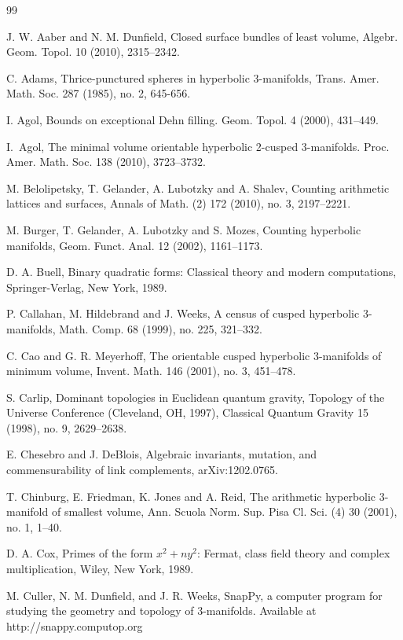 \documentclass[reqno]{amsproc}  %
\begin{document}
\begin{thebibliography}{99}

J. W. Aaber and N. M. Dunfield, Closed surface bundles of least volume, Algebr.  Geom. Topol. 10 (2010), 2315--2342. 

 	C. Adams, Thrice-punctured spheres in hyperbolic 3-manifolds, Trans. Amer. Math. Soc. 287 (1985), no. 2, 645-656. 

     I. Agol, 
Bounds on exceptional Dehn filling. Geom. Topol. 4 (2000), 431--449. 

I.~Agol, {The minimal volume orientable hyperbolic 2-cusped 3-manifolds}.
Proc. Amer. Math. Soc. {138} (2010), 3723--3732.

 M. Belolipetsky, T. Gelander, A. Lubotzky and A. Shalev,
Counting arithmetic lattices and surfaces, Annals of Math. (2) 172 (2010), no. 3,  2197--2221.

  M. Burger, T. Gelander, A. Lubotzky and S. Mozes,
Counting hyperbolic manifolds, Geom. Funct. Anal. 12 (2002), 1161--1173.

 D. A. Buell, Binary quadratic forms:
Classical theory and modern computations, Springer-Verlag, New York, 1989.

 P. Callahan, M. Hildebrand and  J. Weeks, 
A census of cusped hyperbolic 3-manifolds, Math. Comp. 68 (1999), no. 225, 321--332. 

 C. Cao and G. R. Meyerhoff, 
The orientable cusped hyperbolic 3-manifolds of minimum volume,
Invent. Math. 146 (2001), no. 3, 451--478. 

 S. Carlip,    
Dominant topologies in Euclidean quantum gravity,
Topology of the Universe Conference (Cleveland, OH, 1997),
Classical Quantum Gravity 15 (1998), no. 9, 2629--2638.

 E. Chesebro and J. DeBlois,
Algebraic invariants, mutation, and commensurability of link complements,
arXiv:1202.0765.

T. Chinburg, E. Friedman, K. Jones and A. Reid,
The arithmetic hyperbolic 3-manifold of smallest volume, 
Ann. Scuola Norm. Sup. Pisa Cl. Sci. (4) 30 (2001), no. 1, 1--40. 

 D. A. Cox, 
Primes of the form $x^2+ny^2$:
Fermat, class field theory and complex multiplication, Wiley, New York, 1989.

 M. Culler, N. M. Dunfield, and J. R. Weeks, SnapPy, a computer program for studying 
the geometry and topology of 3-manifolds. Available at http://snappy.computop.org


\end{thebibliography}
\end{document}
